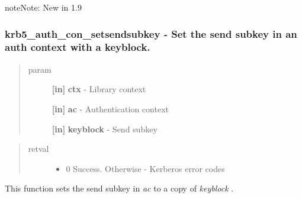 \documentclass[letterpaper,10pt,english]{sphinxmanual}
\begin{document}
\begin{notice}{note}{Note:}
New in 1.9
\end{notice}


\subsubsection{krb5\_auth\_con\_setsendsubkey -  Set the send subkey in an auth context with a keyblock.}
\label{appdev/refs/api/krb5_auth_con_setsendsubkey::doc}\label{appdev/refs/api/krb5_auth_con_setsendsubkey:krb5-auth-con-setsendsubkey-set-the-send-subkey-in-an-auth-context-with-a-keyblock}

\begin{fulllineitems}
\label{appdev/refs/api/krb5_auth_con_setsendsubkey:c.krb5_auth_con_setsendsubkey}
\end{fulllineitems}

\begin{quote}\begin{description}
\item[{param}] \leavevmode
\textbf{{[}in{]}} \textbf{ctx} - Library context

\textbf{{[}in{]}} \textbf{ac} - Authentication context

\textbf{{[}in{]}} \textbf{keyblock} - Send subkey

\end{description}\end{quote}
\begin{quote}\begin{description}
\item[{retval}] \leavevmode\begin{itemize}
\item {} 
0   Success. Otherwise - Kerberos error codes

\end{itemize}

\end{description}\end{quote}

This function sets the send subkey in \emph{ac} to a copy of \emph{keyblock} .
\end{document}
